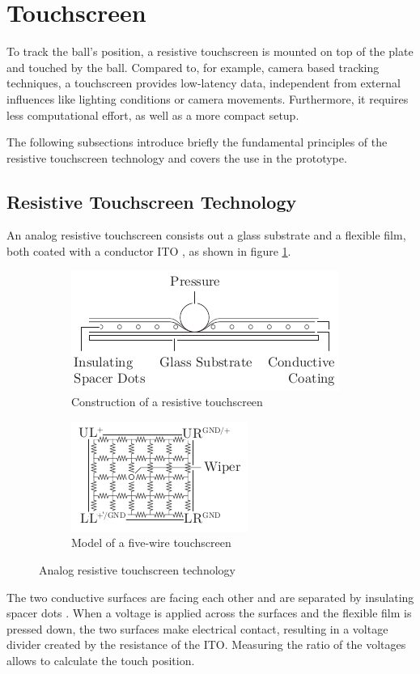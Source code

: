 \section{Touchscreen}
To track the ball's position, a resistive touchscreen is mounted
on top of the plate and touched by the ball. Compared to, for example, camera
based tracking techniques, a touchscreen provides low-latency data,
independent from external influences like lighting conditions or camera
movements. Furthermore, it requires less computational effort, as well as a
more compact setup.

The following subsections introduce briefly the fundamental principles of the
resistive touchscreen technology and covers the use in the prototype.

\subsection{Resistive Touchscreen Technology}
An analog resistive touchscreen consists out a glass substrate and a flexible
film, both coated with a conductor \ac{ITO} \citep{Wal12}, as shown in figure
\ref{fig:touch_build}.
\begin{figure}
	\centering
	\begin{subfigure}{0.49\textwidth}
		\centering
		\includegraphics{../figures/touch_build}
		\caption{Construction of a resistive touchscreen}
		\label{fig:touch_build}
	\end{subfigure}
	\begin{subfigure}{0.49\textwidth}
		\centering
		\includegraphics{../figures/touch_five}
		\caption{Model of a five-wire touchscreen}
		\label{fig:touch_five}
	\end{subfigure}
	\caption{Analog resistive touchscreen technology \citep[adapted from][]{Wal12}}
	\label{fig:touch}
\end{figure}
The two conductive surfaces are facing each other and are separated by
insulating spacer dots \citep{Wal12}. When a voltage is applied across the
surfaces and the flexible film is pressed down, the two surfaces make
electrical contact, resulting in a voltage divider created by the resistance
of the \ac{ITO}. Measuring the ratio of the voltages allows to calculate the
touch position.

